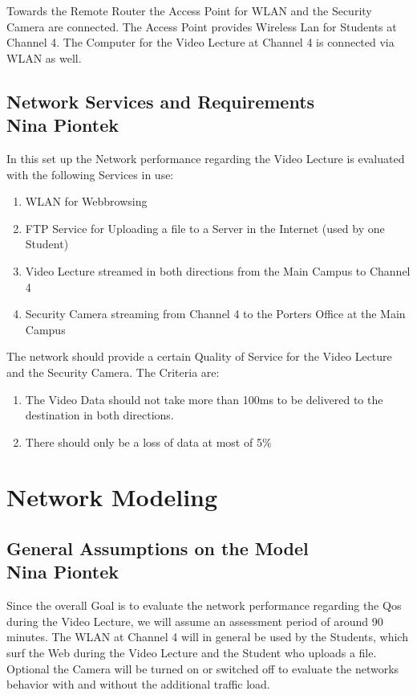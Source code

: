 \documentclass[a4paper,10pt]{book}\usepackage{graphicx}
\begin{document}
Towards the Remote Router the Access Point for WLAN and the Security Camera are connected.
The Access Point provides Wireless Lan for Students at Channel 4. The Computer for the Video Lecture at Channel 4 
is connected via WLAN as well.



\section{Network Services and Requirements\\ {\large Nina Piontek}}

In this set up the Network performance regarding the Video Lecture is evaluated with the following Services in
use:\\
\begin{enumerate}
 \item WLAN for Webbrowsing
 \item FTP Service for Uploading a file to a Server in the Internet (used by one Student) 
 \item Video Lecture streamed in both directions from the Main Campus to Channel 4
 \item Security Camera streaming from Channel 4 to the Porters Office  at the Main Campus
\end{enumerate}

The network should provide a certain Quality of Service for the Video Lecture and the Security Camera.
The Criteria are:\\
\begin{enumerate}
 \item The Video Data should not take more than 100ms to be delivered to the destination in both directions.
 \item There should only be a loss of data at most of 5$ \% $
\end{enumerate}

\chapter{Network Modeling}
\section{General Assumptions on the Model\\ {\large Nina Piontek}}
Since the overall Goal is to evaluate the network performance regarding the Qos during the Video Lecture, we will assume an assessment period
of around 90 minutes. The WLAN at Channel 4 will in general be used by the Students, which surf the Web during the Video Lecture and the Student 
who uploads a file. Optional the Camera will be turned on or switched off to evaluate the networks behavior with and without the additional
traffic load.
\end{document}
